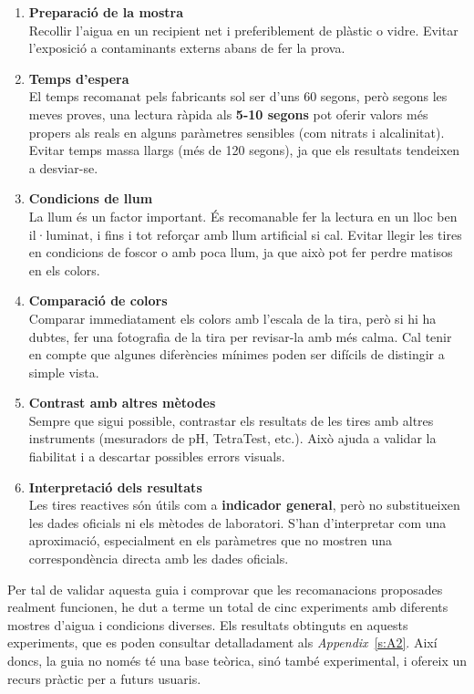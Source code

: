 \begin{enumerate}
    \item \textbf{Preparació de la mostra} \\
    Recollir l’aigua en un recipient net i preferiblement de plàstic o vidre. Evitar l’exposició a contaminants externs abans de fer la prova.

    \item \textbf{Temps d’espera} \\
    El temps recomanat pels fabricants sol ser d’uns 60 segons, però segons les meves proves, una lectura ràpida als \textbf{5-10 segons} pot oferir valors més propers als reals en alguns paràmetres sensibles (com nitrats i alcalinitat). Evitar temps massa llargs (més de 120 segons), ja que els resultats tendeixen a desviar-se.

    \item \textbf{Condicions de llum} \\
    La llum és un factor important. És recomanable fer la lectura en un lloc ben il·luminat, i fins i tot reforçar amb llum artificial si cal. Evitar llegir les tires en condicions de foscor o amb poca llum, ja que això pot fer perdre matisos en els colors.

    \item \textbf{Comparació de colors} \\
    Comparar immediatament els colors amb l’escala de la tira, però si hi ha dubtes, fer una fotografia de la tira per revisar-la amb més calma. Cal tenir en compte que algunes diferències mínimes poden ser difícils de distingir a simple vista.

    \item \textbf{Contrast amb altres mètodes} \\
    Sempre que sigui possible, contrastar els resultats de les tires amb altres instruments (mesuradors de pH, TetraTest, etc.). Això ajuda a validar la fiabilitat i a descartar possibles errors visuals.

    \item \textbf{Interpretació dels resultats} \\
    Les tires reactives són útils com a \textbf{indicador general}, però no substitueixen les dades oficials ni els mètodes de laboratori. S’han d’interpretar com una aproximació, especialment en els paràmetres que no mostren una correspondència directa amb les dades oficials.
\end{enumerate}

Per tal de validar aquesta guia i comprovar que les recomanacions proposades realment funcionen, he dut a terme un total de cinc experiments amb diferents mostres d’aigua i condicions diverses. Els resultats obtinguts en aquests experiments, que es poden consultar detalladament als \textit{Appendix}~\ref{s:A2}. Així doncs, la guia no només té una base teòrica, sinó també experimental, i ofereix un recurs pràctic per a futurs usuaris.



